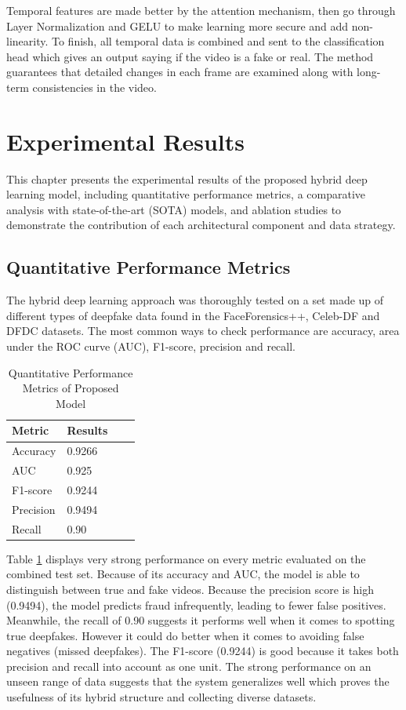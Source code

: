 \documentclass[conference]{IEEEtran}
\begin{document}
Temporal features are made better by the attention mechanism, then go through Layer Normalization and GELU to make learning more secure and add non-linearity. To finish, all temporal data is combined and sent to the classification head which gives an output saying if the video is a fake or real. The method guarantees that detailed changes in each frame are examined along with long-term consistencies in the video.



\section{Experimental Results}
This chapter presents the experimental results of the proposed hybrid deep learning model, including quantitative performance metrics, a comparative analysis with state-of-the-art (SOTA) models, and ablation studies to demonstrate the contribution of each architectural component and data strategy.

\subsection{Quantitative Performance Metrics}
The hybrid deep learning approach was thoroughly tested on a set made up of different types of deepfake data found in the FaceForensics++, Celeb-DF and DFDC datasets. The most common ways to check performance are accuracy, area under the ROC curve (AUC), F1-score, precision and recall.

\begin{table}[htbp]
\caption{Quantitative Performance Metrics of Proposed Model}
\centering
\begin{tabular}{|l|l|l|l|}
\toprule
\textbf{Metric}  & \textbf{Results} \\
\midrule
Accuracy &  0.9266 \\
\midrule
AUC & 0.925 \\
\midrule
F1-score &  0.9244 \\
\midrule
Precision &  0.9494 \\
\midrule
Recall &  0.90 \\
\bottomrule
\end{tabular}
\label{table:quantitative_performance_metrics}
\end{table}

Table \ref{table:quantitative_performance_metrics} displays very strong performance on every metric evaluated on the combined test set. Because of its accuracy and AUC, the model is able to distinguish between true and fake videos. Because the precision score is high (0.9494), the model predicts fraud infrequently, leading to fewer false positives. Meanwhile, the recall of 0.90 suggests it performs well when it comes to spotting true deepfakes. However it could do better when it comes to avoiding false negatives (missed deepfakes). The F1-score (0.9244) is good because it takes both precision and recall into account as one unit. The strong performance on an unseen range of data suggests that the system generalizes well which proves the usefulness of its hybrid structure and collecting diverse datasets.
\end{document}
